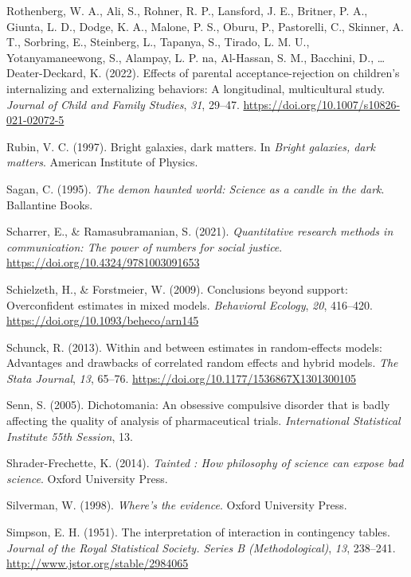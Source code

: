 \documentclass[
  letterpaper,
  DIV=11,
  numbers=noendperiod]{scrreprt}
\newlength{\cslhangindent}
\newenvironment{CSLReferences}[2] %
 {\begin{list}{}{%
  \setlength{\itemindent}{0pt}
  \setlength{\leftmargin}{0pt}
  \setlength{\parsep}{0pt}
  \ifodd #1
   \setlength{\leftmargin}{\cslhangindent}
   \setlength{\itemindent}{-1\cslhangindent}
  \fi
  \setlength{\itemsep}{#2\baselineskip}}}
 {\end{list}}
\begin{document}
\begin{CSLReferences}{1}{0}
Rothenberg, W. A., Ali, S., Rohner, R. P., Lansford, J. E., Britner, P.
A., Giunta, L. D., Dodge, K. A., Malone, P. S., Oburu, P., Pastorelli,
C., Skinner, A. T., Sorbring, E., Steinberg, L., Tapanya, S., Tirado, L.
M. U., Yotanyamaneewong, S., Alampay, L. P. na, Al-Hassan, S. M.,
Bacchini, D., \ldots{} Deater-Deckard, K. (2022). Effects of parental
acceptance-rejection on children's internalizing and externalizing
behaviors: A longitudinal, multicultural study. \emph{Journal of Child
and Family Studies}, \emph{31}, 29--47.
\url{https://doi.org/10.1007/s10826-021-02072-5}

Rubin, V. C. (1997). Bright galaxies, dark matters. In \emph{Bright
galaxies, dark matters}. American Institute of Physics.

Sagan, C. (1995). \emph{The demon haunted world: Science as a candle in
the dark}. Ballantine Books.

Scharrer, E., \& Ramasubramanian, S. (2021). \emph{Quantitative research
methods in communication: The power of numbers for social justice}.
\url{https://doi.org/10.4324/9781003091653}

Schielzeth, H., \& Forstmeier, W. (2009). Conclusions beyond support:
Overconfident estimates in mixed models. \emph{Behavioral Ecology},
\emph{20}, 416--420. \url{https://doi.org/10.1093/beheco/arn145}

Schunck, R. (2013). Within and between estimates in random-effects
models: Advantages and drawbacks of correlated random effects and hybrid
models. \emph{The Stata Journal}, \emph{13}, 65--76.
\url{https://doi.org/10.1177/1536867X1301300105}

Senn, S. (2005). Dichotomania: An obsessive compulsive disorder that is
badly affecting the quality of analysis of pharmaceutical trials.
\emph{International Statistical Institute 55th Session}, 13.

Shrader-Frechette, K. (2014). \emph{Tainted : How philosophy of science
can expose bad science}. Oxford University Press.

Silverman, W. (1998). \emph{Where's the evidence}. Oxford University
Press.

Simpson, E. H. (1951). The interpretation of interaction in contingency
tables. \emph{Journal of the Royal Statistical Society. Series B
(Methodological)}, \emph{13}, 238--241.
\url{http://www.jstor.org/stable/2984065}


\end{CSLReferences}
\end{document}
